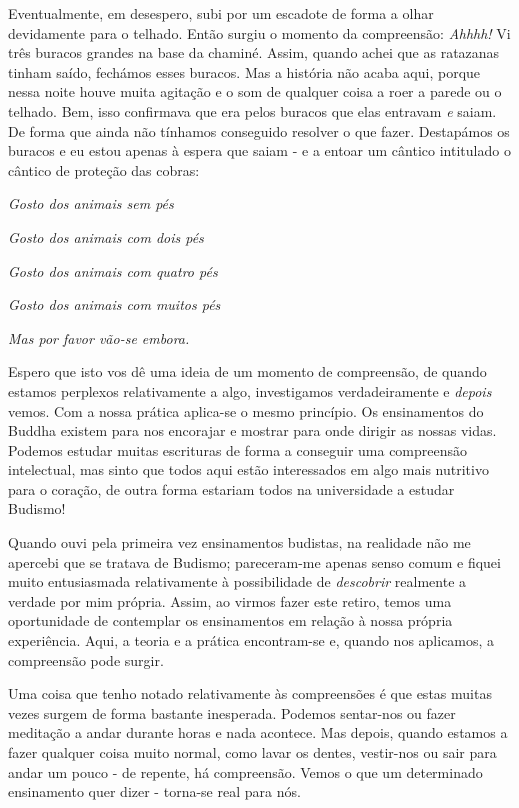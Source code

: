 Eventualmente, em desespero, subi por um escadote de forma a olhar
devidamente para o telhado. Então surgiu o momento da compreensão:
\emph{Ahhhh!} Vi três buracos grandes na base da chaminé. Assim, quando
achei que as ratazanas tinham saído, fechámos esses buracos. Mas a
história não acaba aqui, porque nessa noite houve muita agitação e o som
de qualquer coisa a roer a parede ou o telhado. Bem, isso confirmava que
era pelos buracos que elas entravam \emph{e} saiam. De forma que ainda
não tínhamos conseguido resolver o que fazer. Destapámos os buracos e eu
estou apenas à espera que saiam - e a entoar um cântico intitulado o
cântico de proteção das cobras:

\emph{Gosto dos animais sem pés}

\emph{Gosto dos animais com dois pés}

\emph{Gosto dos animais com quatro pés}

\emph{Gosto dos animais com muitos pés }

\emph{Mas por favor vão-se embora.}

Espero que isto vos dê uma ideia de um momento de compreensão, de quando
estamos perplexos relativamente a algo, investigamos verdadeiramente e
\emph{depois} vemos. Com a nossa prática aplica-se o mesmo princípio. Os
ensinamentos do Buddha existem para nos encorajar e mostrar para onde
dirigir as nossas vidas. Podemos estudar muitas escrituras de forma a
conseguir uma compreensão intelectual, mas sinto que todos aqui estão
interessados em algo mais nutritivo para o coração, de outra forma
estariam todos na universidade a estudar Budismo!

Quando ouvi pela primeira vez ensinamentos budistas, na realidade não me
apercebi que se tratava de Budismo; pareceram-me apenas senso comum e
fiquei muito entusiasmada relativamente à possibilidade de
\emph{descobrir} realmente a verdade por mim própria. Assim, ao virmos
fazer este retiro, temos uma oportunidade de contemplar os ensinamentos
em relação à nossa própria experiência. Aqui, a teoria e a prática
encontram-se e, quando nos aplicamos, a compreensão pode surgir.

Uma coisa que tenho notado relativamente às compreensões é que estas
muitas vezes surgem de forma bastante inesperada. Podemos sentar-nos ou
fazer meditação a andar durante horas e nada acontece. Mas depois,
quando estamos a fazer qualquer coisa muito normal, como lavar os
dentes, vestir-nos ou sair para andar um pouco - de repente, há
compreensão. Vemos o que um determinado ensinamento quer dizer -
torna-se real para nós.

